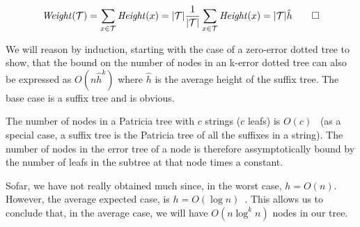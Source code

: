 \[ \mathit{Weight}(\mathcal{T}) = \sum_{x \in \mathcal{T}}\mathit{Height}(x) = |\mathcal{T}|\frac{1}{|\mathcal{T}|}\sum_{x \in \mathcal{T}}\mathit{Height}(x) = |\mathcal{T}|\hat{h} \qed \]

We will reason by induction, starting with the case of a zero-error dotted tree to show, that the bound on the number of nodes in an k-error dotted tree can also be expressed as $O(n\hat{h}^k)$ where $\hat{h}$ is the average height of the suffix tree. The base case is a suffix tree and is obvious.

The number of nodes in a Patricia tree with $c$ strings ($c$ leafs) is $O(c)$~\cite{patricia} (as a special case, a suffix tree is the Patricia tree of all the suffixes in a string). The number of nodes in the error tree of a node is therefore assymptotically bound by the number of leafs in the subtree at that node times a constant.




Sofar, we have not really obtained much since, in the worst case, $h=O(n)$. However, the average expected case, is $h=O(\log n)$~\cite{devroye:note,szpankowski:unexpected}. This allows us to conclude that, in the average case, we will have $O(n\log^k n)$ nodes in our tree.

